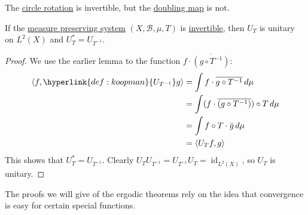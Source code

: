 \documentclass{article}
\begin{document}
\begin{eg}
  The \hyperlink{def:circ}{circle rotation} is invertible, but the \hyperlink{def:doubling}{doubling map} is not.
\end{eg}
\begin{lemma}
  If the \hyperlink{def:mps}{measure preserving system} $(X, \mathcal{B}, \mu, T)$ is \hyperlink{def:inv}{invertible}, then \hyperlink{def:koopman}{$U_T$} is unitary on $L^2(X)$ and $U_T^* = U_{T^{-1}}$.
\end{lemma}
\begin{proof}
  We use the earlier lemma to the function $f \cdot \overline{(g \circ T^{-1})}$:
  \begin{align*}
    \langle f, \hyperlink{def:koopman}{U_{T^{-1}}} g \rangle &= \int f \cdot \overline{g \circ T^{-1}} \, d\mu \\
                                    &= \int (f \cdot \overline{(g \circ T^{-1})}) \circ T\,d\mu \\
                                    &= \int f\circ T \cdot \bar{g}\,d\mu \\
                                    &= \langle U_T f, g \rangle
  \end{align*}
  This shows that $U_T^* = U_{T^{-1}}$. Clearly $U_T U_{T^{-1}} = U_{T^{-1}} U_T = \operatorname{id}_{L^2(X)}$, so $U_T$ is unitary.
\end{proof}
The proofs we will give of the ergodic theorems rely on the idea that convergence is easy for certain special functions.
\end{document}
